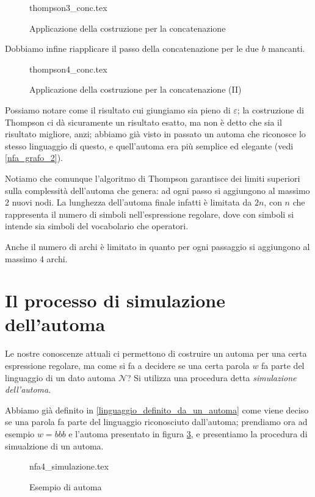 \documentclass[class=book, crop=false, oneside, 12pt]{standalone}
\begin{document}
\begin{figure}
    \centering
    {thompson3_conc.tex}
    \caption{Applicazione della costruzione per la concatenazione}
    \label{esempio_Thompson_3}
\end{figure}

\noindent Dobbiamo infine riapplicare il passo della concatenazione per le due \(b\) mancanti.

\begin{figure}
    \centering
    {thompson4_conc.tex}
    \caption{Applicazione della costruzione per la concatenazione (II)}
    \label{esempio_Thompson_4}
\end{figure}

Possiamo notare come il risultato cui giungiamo sia pieno di \(\varepsilon\); la costruzione di Thompson ci dà sicuramente un risultato esatto, ma non è detto che sia il risultato migliore, anzi; abbiamo già visto in passato un automa che riconosce lo stesso linguaggio di questo, e quell'automa era più semplice ed elegante (vedi \ref{nfa_grafo_2}).

Notiamo che comunque l’algoritmo di Thompson garantisce dei limiti superiori sulla complessità dell’automa che genera: ad ogni passo si aggiungono al massimo \(2\) nuovi nodi.
La lunghezza dell’automa finale infatti è limitata da \(2n\), con \(n\) che rappresenta il numero di simboli nell’espressione regolare, dove con simboli si intende sia simboli del vocabolario che operatori.

Anche il numero di archi è limitato in quanto per ogni passaggio si aggiungono al massimo \(4\) archi.

\section{Il processo di simulazione dell’automa}
Le nostre conoscenze attuali ci permettono di costruire un automa per una certa espressione regolare, ma come si fa a decidere se una certa parola \(w\) fa parte del linguaggio di un dato automa \(\mathcal{N}\)? Si utilizza una procedura detta \emph{simulazione dell’automa}.

Abbiamo già definito in \ref{linguaggio_definito_da_un_automa} come viene deciso se una parola fa parte del linguaggio riconosciuto dall’automa; prendiamo ora ad esempio \(w = bbb\) e l’automa presentato in figura \ref{automa_secondo_esempio}, e presentiamo la procedura di simualzione di un automa.

\begin{figure}
    \centering
    {nfa4_simulazione.tex}
    \caption{Esempio di automa}
    \label{automa_secondo_esempio}
\end{figure}
\end{document}
